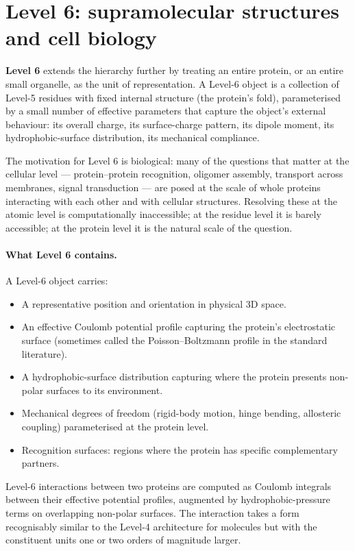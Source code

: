 \section{Level 6: supramolecular structures and cell biology}\label{sec:level6}

\textbf{Level 6} extends the hierarchy further by treating an entire protein, or an entire small organelle, as the unit of representation. A Level-6 object is a collection of Level-5 residues with fixed internal structure (the protein's fold), parameterised by a small number of effective parameters that capture the object's external behaviour: its overall charge, its surface-charge pattern, its dipole moment, its hydrophobic-surface distribution, its mechanical compliance.

The motivation for Level 6 is biological: many of the questions that matter at the cellular level --- protein--protein recognition, oligomer assembly, transport across membranes, signal transduction --- are posed at the scale of whole proteins interacting with each other and with cellular structures. Resolving these at the atomic level is computationally inaccessible; at the residue level it is barely accessible; at the protein level it is the natural scale of the question.

\paragraph{What Level 6 contains.}
A Level-6 object carries:
\begin{itemize}
\item A representative position and orientation in physical 3D space.
\item An effective Coulomb potential profile capturing the protein's electrostatic surface (sometimes called the Poisson--Boltzmann profile in the standard literature).
\item A hydrophobic-surface distribution capturing where the protein presents non-polar surfaces to its environment.
\item Mechanical degrees of freedom (rigid-body motion, hinge bending, allosteric coupling) parameterised at the protein level.
\item Recognition surfaces: regions where the protein has specific complementary partners.
\end{itemize}
Level-6 interactions between two proteins are computed as Coulomb integrals between their effective potential profiles, augmented by hydrophobic-pressure terms on overlapping non-polar surfaces. The interaction takes a form recognisably similar to the Level-4 architecture for molecules but with the constituent units one or two orders of magnitude larger.

